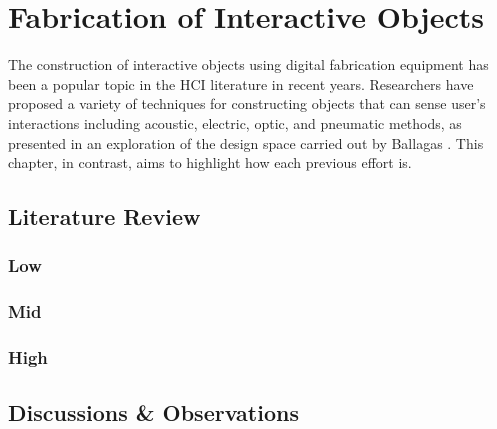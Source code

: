\chapter{Fabrication of Interactive Objects} \label{ch:background}
  The construction of interactive objects using digital fabrication equipment
  has been a popular topic in the HCI literature in recent years. Researchers
  have proposed a variety of techniques for constructing objects that can sense
  user's interactions including acoustic, electric, optic, and pneumatic
  methods, as presented in an exploration of the design space carried out by
  Ballagas \etal. This chapter, in contrast, aims to highlight how \pap each
  previous effort is.

  \section{Literature Review}
    \subsection*{Low \pap}
    \subsection*{Mid \pap}
    \subsection*{High \pap}
  
  \section{Discussions \& Observations}
